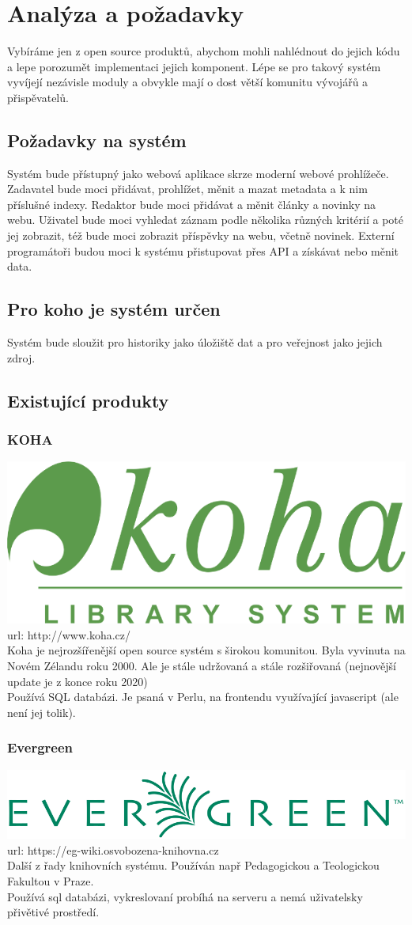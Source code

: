 \chapter{Analýza a požadavky}
 Vybíráme jen z open source produktů, abychom mohli nahlédnout
do jejich kódu a lepe porozumět implementaci jejich komponent.
Lépe se pro takový systém vyvíjejí nezávisle moduly a
obvykle mají o dost větší komunitu vývojářů a přispěvatelů.


\section{Požadavky na systém}
Systém bude přístupný jako webová aplikace skrze moderní webové prohlížeče.
Zadavatel bude moci přidávat, prohlížet, měnit a mazat metadata a k nim příslušné indexy.
Redaktor bude moci přidávat a měnit články a novinky na webu.
Uživatel bude moci vyhledat záznam podle několika různých kritérií a poté jej zobrazit,
též bude moci zobrazit příspěvky na webu, včetně novinek.
Externí programátoři budou moci k systému přistupovat přes API a získávat nebo měnit data. 


\section{Pro koho je systém určen}
Systém bude sloužit pro historiky jako úložiště dat a pro veřejnost jako jejich zdroj.


\section{Existující produkty}
\subsection{KOHA}
\includegraphics[width=.25\textwidth]{img/KOHA_Logo.png}\\
url: http://www.koha.cz/\\
Koha je nejrozšířenější open source systém s širokou komunitou.
Byla vyvinuta na Novém Zélandu roku 2000.
Ale je stále udržovaná a stále rozšiřovaná
(nejnovější update je z konce roku 2020)
\\
Používá SQL databázi.
Je psaná v Perlu, na frontendu využívající javascript (ale není jej tolik).

\subsection{Evergreen}
\includegraphics[width=.25\textwidth]{img/Evergreen_Logo.png}\\
url: https://eg-wiki.osvobozena-knihovna.cz\\
Další z řady knihovních systému.
Používán např Pedagogickou a Teologickou Fakultou v Praze.\\
Používá sql databázi, vykreslovaní probíhá na serveru a nemá uživatelsky přivětivé prostředí.

